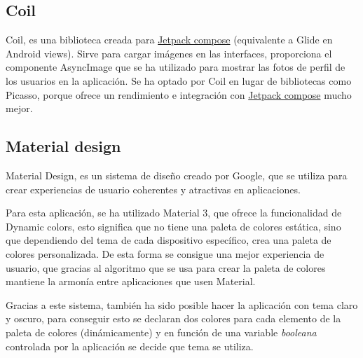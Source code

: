 \subsection{Coil} 
Coil\hyperlink{cap:biblio}{}, es una biblioteca creada para \hyperlink{subsec:compose}{Jetpack compose} (equivalente a
Glide\hyperlink{cap:biblio}{} en Android views). Sirve para cargar imágenes en las interfaces, proporciona el componente AsyncImage que se ha utilizado para mostrar las fotos de perfil de los usuarios en la aplicación. Se ha optado por Coil en lugar de bibliotecas como 
Picasso\hyperlink{cap:biblio}{}, porque ofrece un rendimiento e integración con \hyperlink{subsec:compose}{Jetpack compose} mucho mejor. 

\subsection{Material design}
\label{subsec:material_design}
Material Design\hyperlink{cap:biblio}{}, es un sistema de diseño creado por Google, que se utiliza para crear experiencias de usuario coherentes y atractivas en aplicaciones. 

Para esta aplicación, se ha utilizado Material 3, que ofrece la funcionalidad de Dynamic colors, esto significa que no tiene una paleta de colores estática, sino que dependiendo del tema de cada dispositivo específico, crea una paleta de colores personalizada. De esta forma se consigue una mejor experiencia de usuario, que gracias al algoritmo que se usa para crear la paleta de colores mantiene la armonía entre aplicaciones que usen Material.

Gracias a este sistema, también ha sido posible hacer la aplicación con tema claro y oscuro, para conseguir esto se declaran dos colores para cada elemento de la paleta de colores (dinámicamente) y en función de una variable \textit{booleana} controlada por la aplicación se decide que tema se utiliza.